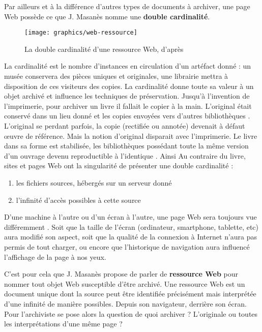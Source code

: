 \documentclass[symmetric,justified,marginals=raggedouter]{tufte-book}
\begin{document}
\noindent Par ailleurs et à la différence d'autres types de documents à archiver, une page Web possède ce que J. Masanès \citep[p.47]{masanes_web_2006} nomme une \textbf{double cardinalité}. 

\begin{figure}
  \texttt{[image: graphics/web-ressource]}
  \caption{La double cardinalité d'une ressource Web, d'après \citep{masanes_web_2006}}
  \label{fig:web-ressource}
\end{figure} 

\noindent La cardinalité est le nombre d'instances en circulation d'un artéfact donné : un musée conservera des pièces uniques et originales, une librairie mettra à disposition de ces visiteurs des copies. La cardinalité donne toute sa valeur à un objet archivé et influence les techniques de préservation. Jusqu'à l'invention de l'imprimerie, pour archiver un livre il fallait le copier à la main. L'original était conservé dans un lieu donné et les copies envoyées vers d'autres bibliothèques \citep{canfora_vanished_1990}. L'original se perdant parfois, la copie (rectifiée ou annotée) devenait à défaut œuvre de référence. Mais la notion d'original disparait avec l'imprimerie. Le livre dans sa forme est stabilisée, les bibliothèques possédant toute la même version d'un ouvrage devenu reproductible à l'identique \citep{febvre_apparition_2013}. Ainsi  Au contraire du livre, sites et pages Web ont la singularité de présenter une double cardinalité : 

\begin{enumerate}[leftmargin=*]  
\item les fichiers sources, hébergés sur un serveur donné 
\item l'infinité d'accès possibles à cette source
\end{enumerate}

\noindent D'une machine à l'autre ou d'un écran à l'autre, une page Web sera toujours vue différemment \citep{bon_apres_2014}. Soit que la taille de l'écran (ordinateur, smartphone, tablette, etc) aura modifié son aspect, soit que la qualité de la connexion à Internet n'aura pas permis de tout charger, ou encore que l'historique de navigation aura influencé l'affichage de la page à nos yeux. 

C'est pour cela que J. Masanès propose de parler de \textbf{ressource Web} \citep[p.48]{masanes_web_2006} pour nommer tout objet Web susceptible d'être archivé. Une ressource Web est un document unique dont la source peut être identifiée précisément mais interprétée d'une infinité de ma\-nière possibles. Depuis son navigateur, derrière son écran. Pour l'archiviste se pose alors la question de quoi archiver ? L'originale ou toutes les interprétations d'une même page ? 
\end{document}
